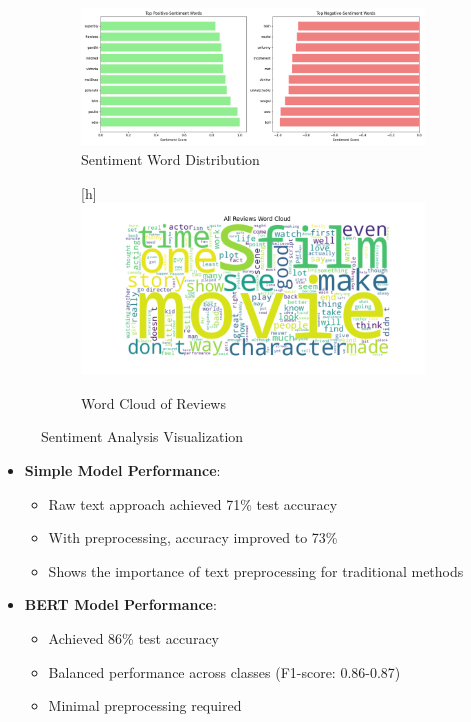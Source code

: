 \documentclass[numbers,nonatbib]{article}
\begin{document}
\begin{figure}[h]
\centering
\begin{subfigure}{.48\textwidth}
    \centering
    \includegraphics[width=\linewidth]{../analysis/plots/sentiment_words.png}
    \caption{Sentiment Word Distribution}
    \label{fig:sentiment_dist}
\end{subfigure}
\hfill
\begin{subfigure}{.48\textwidth}[h]
    \centering
    \includegraphics[width=\linewidth]{../analysis/plots/wordcloud_all.png}
    \caption{Word Cloud of Reviews}
    \label{fig:wordcloud}
\end{subfigure}
\caption{Sentiment Analysis Visualization}
\label{fig:model_comparison}
\end{figure}

\begin{itemize}
    \item \textbf{Simple Model Performance}:
    \begin{itemize}
        \item Raw text approach achieved 71\% test accuracy
        \item With preprocessing, accuracy improved to 73\%
        \item Shows the importance of text preprocessing for traditional methods
    \end{itemize}
    
    \item \textbf{BERT Model Performance}:
    \begin{itemize}
        \item Achieved 86\% test accuracy
        \item Balanced performance across classes (F1-score: 0.86-0.87)
        \item Minimal preprocessing required
    \end{itemize}
\end{itemize}
\end{document}
